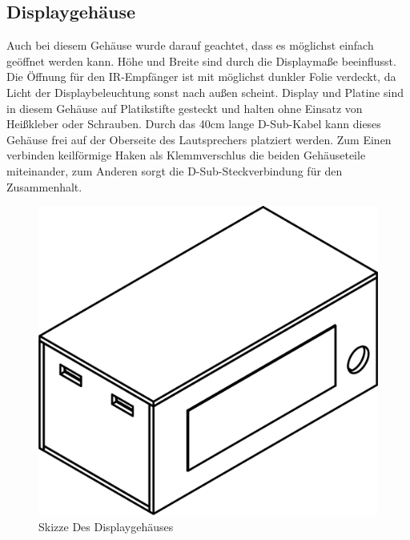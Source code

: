 \documentclass[11pt, titlepage, fleqn]{report}
\begin{document}
			\subsection{Displaygehäuse}
				Auch bei diesem Gehäuse wurde darauf geachtet, dass es möglichst einfach geöffnet werden kann. Höhe und Breite sind durch die Displaymaße beeinflusst. Die Öffnung für den IR-Empfänger ist mit möglichst dunkler Folie verdeckt, da Licht der Displaybeleuchtung sonst nach außen scheint. Display und Platine sind in diesem Gehäuse auf Platikstifte gesteckt und halten ohne Einsatz von Heißkleber oder Schrauben. Durch das 40cm lange D-Sub-Kabel kann dieses Gehäuse frei auf der Oberseite des Lautsprechers platziert werden. Zum Einen verbinden keilförmige Haken als Klemmverschlus die beiden Gehäuseteile miteinander, zum Anderen sorgt die D-Sub-Steckverbindung für den Zusammenhalt.
				\vspace{3em}
				\begin{figure}[htbp]
					\centering
					\includegraphics[width=0.75\linewidth]{./img/Display_Case_Draw.png}
					\caption{Skizze Des Displaygehäuses
					\label{fig:imgDisplayDraw}}			
				\end{figure}
			\newpage
\end{document}
